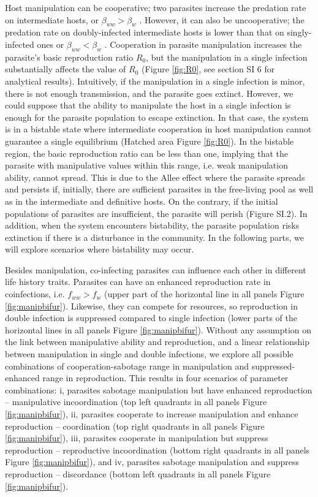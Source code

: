 \documentclass[a4paper]{scrartcl}
\begin{document}
Host manipulation can be cooperative; two parasites increase the predation rate on intermediate hosts, or $\beta_{ww} > \beta_w$ \citep{Hafer:2015gl}. 
However, it can also be uncooperative; the predation rate on doubly-infected intermediate hosts is lower than that on singly-infected ones or $\beta_{ww} < \beta_w$ \citep{Hafer:2015gl}.
Cooperation in parasite manipulation increases the parasite's basic reproduction ratio $R_0$, but the manipulation in a single infection substantially affects the value of $R_0$ (Figure \ref{fig:R0}, see section SI 6 for analytical results). 
Intuitively, if the manipulation in a single infection is minor, there is not enough transmission, and the parasite goes extinct.
However, we could suppose that the ability to manipulate the host in a single infection is enough for the parasite population to escape extinction. 
In that case, the system is in a bistable state where intermediate cooperation in host manipulation cannot guarantee a single equilibrium (Hatched area Figure \ref{fig:R0}). 
In the bistable region, the basic reproduction ratio can be less than one, implying that the parasite with manipulative values within this range, i.e. weak manipulation ability, cannot spread.
This is due to the Allee effect \citep{stephens:OIKOS:1999} where the parasite spreads and persists if, initially, there are sufficient parasites in the free-living pool as well as in the intermediate and definitive hosts.
On the contrary, if the initial populations of parasites are insufficient, the parasite will perish (Figure SI.2).
In addition, when the system encounters bistability, the parasite population risks extinction if there is a disturbance in the community.
In the following parts, we will explore scenarios where bistability may occur. 

Besides manipulation, co-infecting parasites can influence each other in different life history traits.
Parasites can have an enhanced reproduction rate in coinfections, i.e. $f_{ww} > f_w$ (upper part of the horizontal line in all panels Figure \ref{fig:manipbifur}). 
Likewise, they can compete for resources, so reproduction in double infection is suppressed compared to single infection (lower parts of the horizontal lines in all panels Figure \ref{fig:manipbifur}). 
Without any assumption on the link between manipulative ability and reproduction, and a linear relationship between manipulation in single and double infections, we explore all possible combinations of cooperation-sabotage range in manipulation and suppressed-enhanced range in reproduction. This results in four scenarios of parameter combinations: i, parasites sabotage manipulation but have enhanced reproduction -- manipulative incoordination (top left quadrants in all panels Figure \ref{fig:manipbifur}), ii, parasites cooperate to increase manipulation and enhance reproduction -- coordination (top right quadrants in all panels Figure \ref{fig:manipbifur}), iii, parasites cooperate in manipulation but suppress reproduction -- reproductive incoordination (bottom right quadrants in all panels Figure \ref{fig:manipbifur}), and iv, parasites sabotage manipulation and suppress reproduction -- discordance (bottom left quadrants in all panels Figure \ref{fig:manipbifur}).
\end{document}
